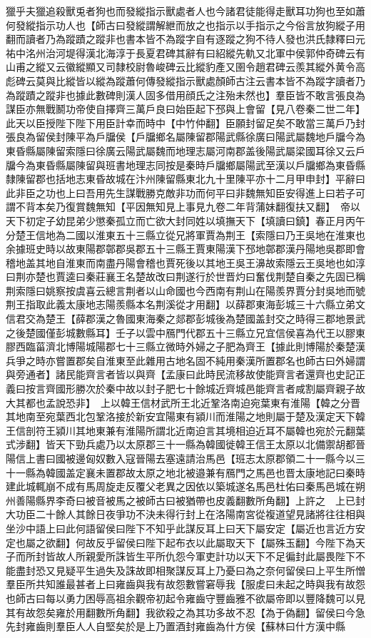 獵乎夫獵追殺獸兎者狗也而發縱指示獸處者人也今諸君徒能得走獸耳功狗也至如蕭何發縱指示功人也【師古曰發縱謂解紲而放之也指示以手指示之今俗言放狗縱子用翻而讀者乃為蹤蹟之蹤非也書本皆不為蹤字自有逐蹤之狗不待人發也洪氏隸釋曰元祐中洺州治河堤得漢北海淳于長夏君碑其辭有曰紹縱先軌又北軍中侯郭仲奇碑云有山甫之縱又云徽縱顯又司隸校尉魯峻碑云比縱豹產又圉令趙君碑云羨其縱外黄令高彪碑云莫與比縱皆以縱為蹤蕭何傳發縱指示獸處顏師古注云書本皆不為蹤字讀者乃為蹤蹟之蹤非也據此數碑則漢人固多借用顔氏之注殆未然也】羣臣皆不敢言張良為謀臣亦無戰鬭功帝使自擇齊三萬戶良曰始臣起下邳與上會留【見八卷秦二世二年】此天以臣授陛下陛下用臣計幸而時中【中竹仲翻】臣願封留足矣不敢當三萬戶乃封張良為留侯封陳平為戶牖侯【戶牖鄉名屬陳留郡陽武縣徐廣曰陽武屬魏地戶牖今為東昏縣屬陳留索隱曰徐廣云陽武屬魏而地理志屬河南郡盖後陽武屬梁國耳徐又云戶牖今為東昏縣屬陳留與班書地理志同按是秦時戶牖鄉屬陽武至漢以戶牖鄉為東昏縣隸陳留郡也括地志東昏故城在汴州陳留縣東北九十里陳平亦十二月甲申封】平辭曰此非臣之功也上曰吾用先生謀戰勝克敵非功而何平曰非魏無知臣安得進上曰若子可謂不背本矣乃復賞魏無知【平因無知見上事見九卷二年背蒲妹翻復扶又翻】　帝以天下初定子幼昆弟少懲秦孤立而亡欲大封同姓以填撫天下【填讀曰鎮】春正月丙午分楚王信地為二國以淮東五十三縣立從兄將軍賈為荆王【索隱曰乃王吳地在淮東也余據班史時以故東陽郡鄣郡吳郡五十三縣王賈東陽漢下邳地鄣郡漢丹陽地吳郡即會稽地盖其地自淮東而南盡丹陽會稽也賈死後以其地王吳王濞故索隱云王吳地也如淳曰荆亦楚也賈逵曰秦莊襄王名楚故改曰荆遂行於世晋灼曰奮伐荆楚自秦之先固已稱荆索隱曰姚察按虞喜云總言荆者以山命國也今西南有荆山在陽羨界賈分封吳地而號荆王指取此義太康地志陽羨縣本名荆溪從才用翻】以薛郡東海彭城三十六縣立弟文信君交為楚王【薛郡漢之魯國東海秦之郯郡彭城後為楚國盖封交之時得三郡地景武之後楚國僅彭城數縣耳】壬子以雲中鴈門代郡五十三縣立兄宜信侯喜為代王以膠東膠西臨菑濟北博陽城陽郡七十三縣立微時外婦之子肥為齊王【據此則博陽於秦楚漢兵爭之時亦嘗置郡矣自淮東至此雜用古地名固不純用秦漢所置郡名也師古曰外婦謂與旁通者】諸民能齊言者皆以與齊【孟康曰此時民流移故使能齊言者還齊也史記正義曰按言齊國形勝次於秦中故以封子肥七十餘城近齊城邑能齊言者咸割屬齊親子故大其都也孟說恐非】　上以韓王信材武所王北近鞏洛南迫宛葉東有淮陽【韓之分晋其地南至宛葉西北包鞏洛接於新安宜陽東有潁川而淮陽之地則屬于楚及漢定天下韓王信剖符王潁川其地東兼有淮陽所謂北近南迫言其境相迫近耳不屬韓也宛於元翻葉式涉翻】皆天下勁兵處乃以太原郡三十一縣為韓國徙韓王信王太原以北備禦胡都晉陽信上書曰國被邊匈奴數入寇晉陽去塞遠請治馬邑【班志太原郡領二十一縣今以三十一縣為韓國盖定襄未置郡故太原之地北被邉兼有鴈門之馬邑也晋太康地記曰秦時建此城輒崩不成有馬周旋走反覆父老異之因依以築城遂名馬邑杜佑曰秦馬邑城在朔州善陽縣界李奇曰被音被馬之被師古曰被猶帶也皮義翻數所角翻】上許之　上已封大功臣二十餘人其餘日夜爭功不決未得行封上在洛陽南宮從複道望見諸將往往相與坐沙中語上曰此何語留侯曰陛下不知乎此謀反耳上曰天下屬安定【屬近也言近方安定也屬之欲翻】何故反乎留侯曰陛下起布衣以此屬取天下【屬殊玉翻】今陛下為天子而所封皆故人所親愛所誅皆生平所仇怨今軍吏計功以天下不足徧封此屬畏陛下不能盡封恐又見疑平生過失及誅故即相聚謀反耳上乃憂曰為之奈何留侯曰上平生所憎羣臣所共知誰最甚者上曰雍齒與我有故怨數嘗窘辱我【服䖍曰未起之時與我有故怨也師古曰每以勇力困辱高祖余觀帝初起令雍齒守豐齒雅不欲屬帝即以豐降魏可以見其有故怨矣雍於用翻數所角翻】我欲殺之為其功多故不忍【為于偽翻】留侯曰今急先封雍齒則羣臣人人自堅矣於是上乃置酒封雍齒為什方侯【蘇林曰什方漢中縣